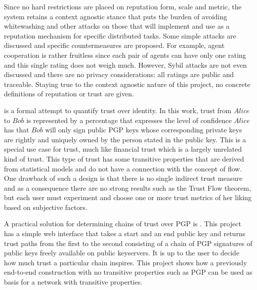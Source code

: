   Since no hard restrictions are placed on reputation form, scale and metric, the system retains a context agnostic stance
  that puts the burden of avoiding whitewashing and other attacks on those that will implement and use \cite{ghkkw} as a
  reputation mechanism for specific distributed tasks. Some simple attacks are discussed and specific countermeasures are
  proposed. For example, agent cooperation is rather fruitless since each pair of agents can have only one rating and this
  single rating does not weigh much. However, Sybil attacks are not even discussed and there are no privacy considerations:
  all ratings are public and traceable. Staying true to the context agnostic nature of this project, no concrete definitions
  of reputation or trust are given.

  \cite{wot} is a formal attempt to quantify trust over identity. In this work, trust from $Alice$ to $Bob$ is represented by
  a percentage that expresses the level of confidence $Alice$ has that $Bob$ will only sign public PGP keys whose
  corresponding private keys are rightly and uniquely owned by the person stated in the public key. This is a special use
  case for trust, much like financial trust which is a largely unrelated kind of trust. This type of trust has some
  transitive properties that are derived from statistical models and do not have a connection with the concept of flow. One
  drawback of such a design is that there is no single indirect trust measure and as a consequence there are no strong
  results such as the Trust Flow theorem, but each user must experiment and choose one or more trust metrics of her liking
  based on subjective factors.

  A practical solution for determining chains of trust over PGP is \cite{pathfinder}. This project has a simple web interface
  that takes a start and an end public key and returns trust paths from the first to the second consisting of a chain of PGP
  signatures of public keys freely available on public keyservers. It is up to the user to decide how much trust a particular
  chain inspires. This project shows how a previously end-to-end construction with no transitive properties such as PGP can
  be used as basis for a network with transitive properties.

